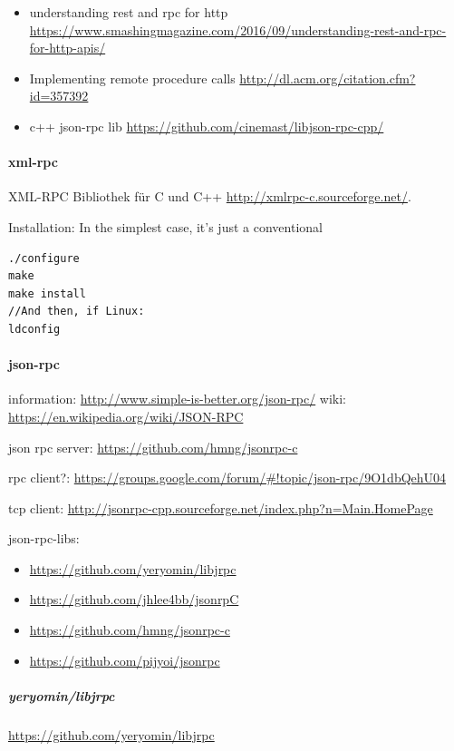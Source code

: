 \documentclass[a4paper,10pt]{article}
\begin{document}
\begin{itemize}
 \item understanding rest and rpc for http \url{https://www.smashingmagazine.com/2016/09/understanding-rest-and-rpc-for-http-apis/}
 \item Implementing remote procedure calls \url{http://dl.acm.org/citation.cfm?id=357392}
 \item c++ json-rpc lib \url{https://github.com/cinemast/libjson-rpc-cpp/}
\end{itemize}

\paragraph{xml-rpc}

XML-RPC Bibliothek für C und C++ \url{http://xmlrpc-c.sourceforge.net/}.

Installation: 
In the simplest case, it's just a conventional\\
\begin{lstlisting}
./configure
make
make install
//And then, if Linux:
ldconfig
\end{lstlisting}

\paragraph{json-rpc}

information: \url{http://www.simple-is-better.org/json-rpc/}
wiki: \url{https://en.wikipedia.org/wiki/JSON-RPC}

json rpc server: \url{https://github.com/hmng/jsonrpc-c}

rpc client?: \url{https://groups.google.com/forum/#!topic/json-rpc/9O1dbQehU04}

tcp client: \url{http://jsonrpc-cpp.sourceforge.net/index.php?n=Main.HomePage}

json-rpc-libs:
\begin{itemize}
 \item \url{https://github.com/yeryomin/libjrpc}
 \item \url{https://github.com/jhlee4bb/jsonrpC}
 \item \url{https://github.com/hmng/jsonrpc-c}
 \item \url{https://github.com/pijyoi/jsonrpc}
\end{itemize}

\subparagraph{yeryomin/libjrpc}

\url{https://github.com/yeryomin/libjrpc}
\end{document}
